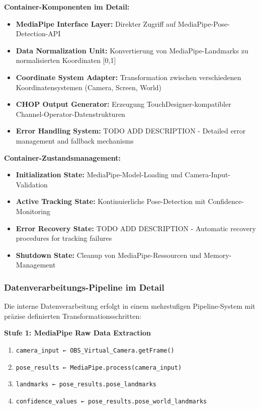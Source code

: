 \textbf{Container-Komponenten im Detail:}
\begin{itemize}
    \item \textbf{MediaPipe Interface Layer:} Direkter Zugriff auf MediaPipe-Pose-Detection-API
    \item \textbf{Data Normalization Unit:} Konvertierung von MediaPipe-Landmarks zu normalisierten Koordinaten [0,1]
    \item \textbf{Coordinate System Adapter:} Transformation zwischen verschiedenen Koordinatensystemen (Camera, Screen, World)
    \item \textbf{CHOP Output Generator:} Erzeugung TouchDesigner-kompatibler Channel-Operator-Datenstrukturen
    \item \textbf{Error Handling System:} TODO ADD DESCRIPTION - Detailed error management and fallback mechanisms
\end{itemize}

\textbf{Container-Zustandsmanagement:}
\begin{itemize}
    \item \textbf{Initialization State:} MediaPipe-Model-Loading und Camera-Input-Validation
    \item \textbf{Active Tracking State:} Kontinuierliche Pose-Detection mit Confidence-Monitoring
    \item \textbf{Error Recovery State:} TODO ADD DESCRIPTION - Automatic recovery procedures for tracking failures
    \item \textbf{Shutdown State:} Cleanup von MediaPipe-Ressourcen und Memory-Management
\end{itemize}

\subsubsection{Datenverarbeitungs-Pipeline im Detail}

Die interne Datenverarbeitung erfolgt in einem mehrstufigen Pipeline-System mit präzise definierten Transformationsschritten:

\textbf{Stufe 1: MediaPipe Raw Data Extraction}
\begin{enumerate}
    \item \texttt{camera\_input ← OBS\_Virtual\_Camera.getFrame()}
    \item \texttt{pose\_results ← MediaPipe.process(camera\_input)}
    \item \texttt{landmarks ← pose\_results.pose\_landmarks}
    \item \texttt{confidence\_values ← pose\_results.pose\_world\_landmarks}
\end{enumerate}


